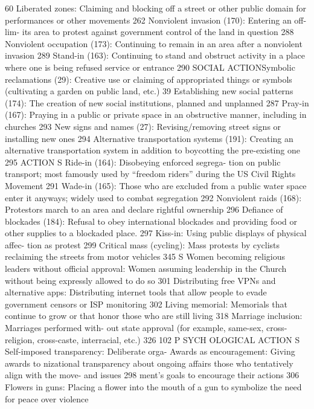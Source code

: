 \documentclass[twoside,a4paper,12pt,fleqn,openany]{extbook}
\begin{document}
 60
Liberated zones: Claiming and blocking off a
street or other public domain for performances
or other movements
 262
Nonviolent invasion (170): Entering an off-lim-
its area to protest against government control
of the land in question
 288
Nonviolent occupation (173): Continuing to
remain in an area after a nonviolent invasion		
289
Stand-in (163): Continuing to stand and obstruct
activity in a place where one is being refused
service or entrance
 290
SOCIAL ACTIONSymbolic reclamations (29): Creative use or
claiming of appropriated things or symbols
(cultivating a garden on public land, etc.) 39
Establishing new social patterns (174): The
creation of new social institutions, planned and
unplanned
 287
Pray-in (167): Praying in a public or private
space in an obstructive manner, including in
churches
 293
New signs and names (27): Revising/removing
street signs or installing new ones
 294
Alternative transportation systems (191):
Creating an alternative transportation system
in addition to boycotting the pre-existing
one
 295
ACTION S
Ride-in (164): Disobeying enforced segrega-
tion on public transport; most famously used
by “freedom riders” during the US Civil Rights
Movement
 291
Wade-in (165): Those who are excluded from
a public water space enter it anyways; widely
used to combat segregation
 292
Nonviolent raids (168): Protestors march to an
area and declare rightful ownership
 296
Defiance of blockades (184): Refusal to obey
international blockades and providing food or
other supplies to a blockaded place.
 297
Kiss-in: Using public displays of physical affec-
tion as protest
 299
Critical mass (cycling): Mass protests by cyclists
reclaiming the streets from motor vehicles 345
S
Women becoming religious leaders without
official approval: Women assuming leadership
in the Church without being expressly allowed
to do so
 301
Distributing free VPNs and alternative
apps: Distributing internet tools that allow
people to evade government censors or ISP
monitoring
 302
Living memorial: Memorials that continue to
grow or that honor those who are still living		
318
Marriage inclusion: Marriages performed with-
out state approval (for example, same-sex,
cross-religion, cross-caste, interracial, etc.)		
326
102
P SYCH OLOGICAL ACTION S
Self-imposed transparency: Deliberate orga-
 Awards as encouragement: Giving awards to
nizational transparency about ongoing affairs
 those who tentatively align with the move-
and issues
 298
 ment’s goals to encourage their actions 306
Flowers in guns: Placing a flower into the
mouth of a gun to symbolize the need for
peace over violence
\end{document}
